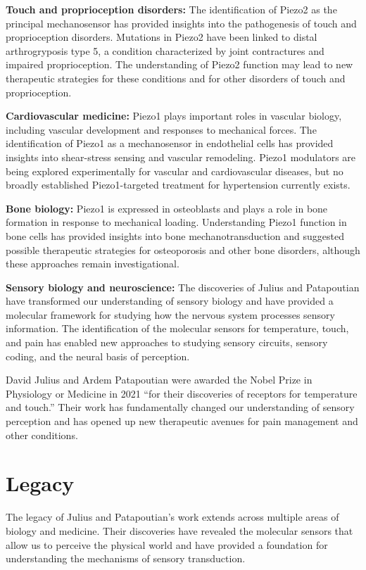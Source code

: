 \textbf{Touch and proprioception disorders:} The identification of Piezo2 as the principal mechanosensor has provided insights into the pathogenesis of touch and proprioception disorders. Mutations in Piezo2 have been linked to distal arthrogryposis type 5, a condition characterized by joint contractures and impaired proprioception. The understanding of Piezo2 function may lead to new therapeutic strategies for these conditions and for other disorders of touch and proprioception.

\textbf{Cardiovascular medicine:} Piezo1 plays important roles in vascular biology, including vascular development and responses to mechanical forces. The identification of Piezo1 as a mechanosensor in endothelial cells has provided insights into shear-stress sensing and vascular remodeling. Piezo1 modulators are being explored experimentally for vascular and cardiovascular diseases, but no broadly established Piezo1-targeted treatment for hypertension currently exists.

\textbf{Bone biology:} Piezo1 is expressed in osteoblasts and plays a role in bone formation in response to mechanical loading. Understanding Piezo1 function in bone cells has provided insights into bone mechanotransduction and suggested possible therapeutic strategies for osteoporosis and other bone disorders, although these approaches remain investigational.

\textbf{Sensory biology and neuroscience:} The discoveries of Julius and Patapoutian have transformed our understanding of sensory biology and have provided a molecular framework for studying how the nervous system processes sensory information. The identification of the molecular sensors for temperature, touch, and pain has enabled new approaches to studying sensory circuits, sensory coding, and the neural basis of perception.

David Julius and Ardem Patapoutian were awarded the Nobel Prize in Physiology or Medicine in 2021 ``for their discoveries of receptors for temperature and touch.'' Their work has fundamentally changed our understanding of sensory perception and has opened up new therapeutic avenues for pain management and other conditions.

\section{Legacy}

The legacy of Julius and Patapoutian's work extends across multiple areas of biology and medicine. Their discoveries have revealed the molecular sensors that allow us to perceive the physical world and have provided a foundation for understanding the mechanisms of sensory transduction.

